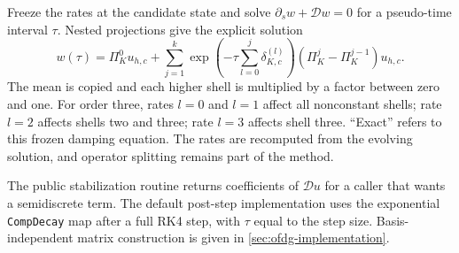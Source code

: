 Freeze the rates at the candidate state and solve
$\partial_s w+\mathcal D w=0$ for a pseudo-time interval $\tau$. Nested
projections give the explicit solution
\begin{equation}
 w(\tau)=\Pi_K^0u_{h,c}+\sum_{j=1}^k
  \exp\!\left(-\tau\sum_{l=0}^j\delta_{K,c}^{(l)}\right)
  (\Pi_K^j-\Pi_K^{j-1})u_{h,c}.
 \label{eq:ofdg-exact-decay}
\end{equation}
The mean is copied and each higher shell is multiplied by a factor between
zero and one. For order three, rates $l=0$ and $l=1$ affect all nonconstant
shells; rate $l=2$ affects shells two and three; rate $l=3$ affects shell three.
``Exact'' refers to this frozen damping equation. The rates are recomputed
from the evolving solution, and operator splitting remains part of the method.

The public stabilization routine returns coefficients of $\mathcal D u$ for
a caller that wants a semidiscrete term. The default post-step implementation uses the exponential
\texttt{CompDecay} map after a full RK4 step, with $\tau$ equal to the step
size. Basis-independent matrix construction is given in
\cref{sec:ofdg-implementation}.
